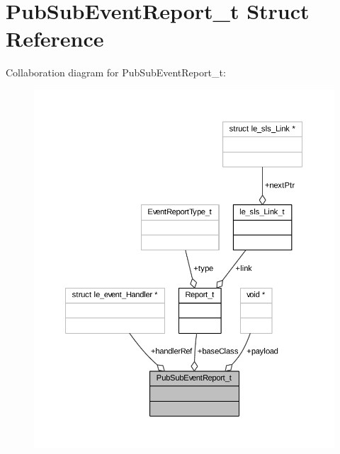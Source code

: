\hypertarget{struct_pub_sub_event_report__t}{}\section{Pub\+Sub\+Event\+Report\+\_\+t Struct Reference}
\label{struct_pub_sub_event_report__t}


Collaboration diagram for Pub\+Sub\+Event\+Report\+\_\+t\+:
\nopagebreak
\begin{figure}[H]
\begin{center}
\leavevmode
\includegraphics[width=350pt]{struct_pub_sub_event_report__t__coll__graph}
\end{center}
\end{figure}
